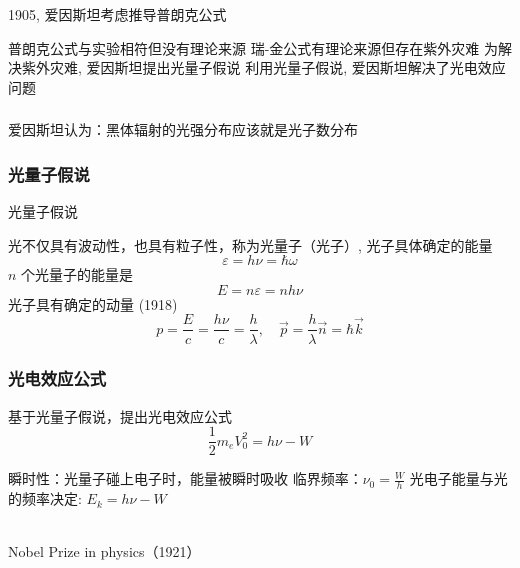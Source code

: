 \begin{frame} 
    1905, 爱因斯坦考虑推导普朗克公式  \\
    \begin{itemize}
        \Item  普朗克公式与实验相符但没有理论来源
        \Item  瑞-金公式有理论来源但存在紫外灾难
        \Item  为解决紫外灾难, 爱因斯坦提出光量子假说
        \Item  利用光量子假说, 爱因斯坦解决了光电效应问题
    \end{itemize}
\end{frame}

\begin{frame}
    \frametitle{}
       爱因斯坦认为：黑体辐射的光强分布应该就是光子数分布
        \begin{figure}
            \centering
        \end{figure}
    \setcounter{subfigure}{0}
\end{frame}

\begin{frame} 
    \frametitle{光量子假说}
    \begin{atcbox}{光量子假说}
        {\begin{itemize}
            \Item 光不仅具有波动性，也具有粒子性，称为光量子（光子）, 
            \Item 光子具体确定的能量
        \[\varepsilon=h\nu = \hbar \omega\]
            \Item $n$ 个光量子的能量是 $$E = n\varepsilon = nh\nu$$
            \Item 光子具有确定的动量 (1918) 
            \[p=\frac{E}{c}=\frac{h\nu}{c}=\frac{h}{\lambda}, \quad \vec{p} = \frac{h}{\lambda} \vec{n} = \hbar \vec{k}\]
        \end{itemize}}
    \end{atcbox}
\end{frame}

\begin{frame} 
    \frametitle{光电效应公式}
    基于光量子假说，提出光电效应公式
    \[
    \frac{1}{2}m_eV_0^2=h\nu-W
    \]
    \begin{itemize}
        \Item  瞬时性：光量子碰上电子时，能量被瞬时吸收
        \Item  临界频率：$\nu_0=\frac{W}{h} $
        \Item  光电子能量与光的频率决定: $E_k=h\nu-W$
    \end{itemize}
    ~~\\ 
    {\color{deepblue} Nobel Prize in physics（1921）}
\end{frame}

